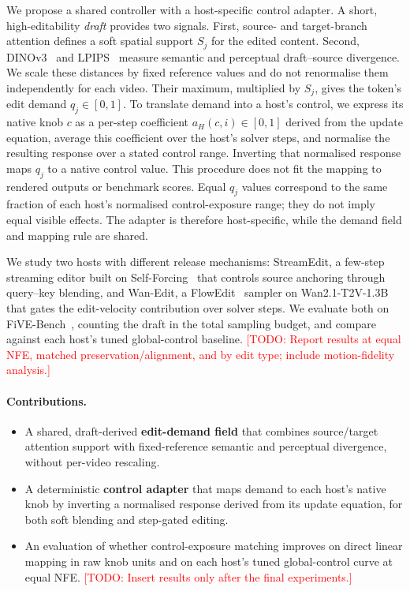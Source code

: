 \documentclass[10pt,twocolumn]{article}
\newcommand{\todo}[1]{\textcolor{red}{[TODO: #1]}}
\begin{document}
We propose a shared controller with a host-specific control adapter. A short, high-editability \emph{draft} provides two signals. First, source- and target-branch attention defines a soft spatial support $S_j$ for the edited content. Second, DINOv3~\cite{dino} and LPIPS~\cite{lpips2018} measure semantic and perceptual draft--source divergence. We scale these distances by fixed reference values and do not renormalise them independently for each video. Their maximum, multiplied by $S_j$, gives the token's edit demand $q_j\in[0,1]$. To translate demand into a host's control, we express its native knob $c$ as a per-step coefficient $a_H(c,i)\in[0,1]$ derived from the update equation, average this coefficient over the host's solver steps, and normalise the resulting response over a stated control range. Inverting that normalised response maps $q_j$ to a native control value. This procedure does not fit the mapping to rendered outputs or benchmark scores. Equal $q_j$ values correspond to the same fraction of each host's normalised control-exposure range; they do not imply equal visible effects. The adapter is therefore host-specific, while the demand field and mapping rule are shared.

We study two hosts with different release mechanisms: StreamEdit, a few-step streaming editor built on Self-Forcing~\cite{selfforcing2025} that controls source anchoring through query--key blending, and Wan-Edit, a FlowEdit~\cite{flowedit2025} sampler on Wan2.1-T2V-1.3B~\cite{wan2025} that gates the edit-velocity contribution over solver steps. We evaluate both on FiVE-Bench~\cite{five2025}, counting the draft in the total sampling budget, and compare against each host's tuned global-control baseline. \todo{Report results at equal NFE, matched preservation/alignment, and by edit type; include motion-fidelity analysis.}

\paragraph{Contributions.}
\begin{itemize}\setlength\itemsep{1pt}
\item A shared, draft-derived \textbf{edit-demand field} that combines source/target attention support with fixed-reference semantic and perceptual divergence, without per-video rescaling.
\item A deterministic \textbf{control adapter} that maps demand to each host's native knob by inverting a normalised response derived from its update equation, for both soft blending and step-gated editing.
\item An evaluation of whether control-exposure matching improves on direct linear mapping in raw knob units and on each host's tuned global-control curve at equal NFE. \todo{Insert results only after the final experiments.}
\end{itemize}
\end{document}
